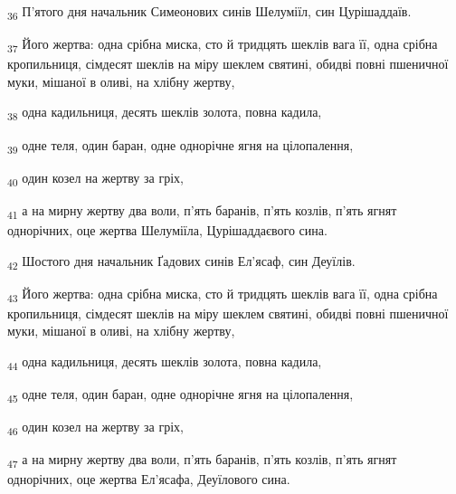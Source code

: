\begin{tcolorbox}
\textsubscript{36} П'ятого дня начальник Симеонових синів Шелуміїл, син Цурішаддаїв.
\end{tcolorbox}
\begin{tcolorbox}
\textsubscript{37} Його жертва: одна срібна миска, сто й тридцять шеклів вага її, одна срібна кропильниця, сімдесят шеклів на міру шеклем святині, обидві повні пшеничної муки, мішаної в оливі, на хлібну жертву,
\end{tcolorbox}
\begin{tcolorbox}
\textsubscript{38} одна кадильниця, десять шеклів золота, повна кадила,
\end{tcolorbox}
\begin{tcolorbox}
\textsubscript{39} одне теля, один баран, одне однорічне ягня на цілопалення,
\end{tcolorbox}
\begin{tcolorbox}
\textsubscript{40} один козел на жертву за гріх,
\end{tcolorbox}
\begin{tcolorbox}
\textsubscript{41} а на мирну жертву два воли, п'ять баранів, п'ять козлів, п'ять ягнят однорічних, оце жертва Шелуміїла, Цурішаддаєвого сина.
\end{tcolorbox}
\begin{tcolorbox}
\textsubscript{42} Шостого дня начальник Ґадових синів Ел'ясаф, син Деуїлів.
\end{tcolorbox}
\begin{tcolorbox}
\textsubscript{43} Його жертва: одна срібна миска, сто й тридцять шеклів вага її, одна срібна кропильниця, сімдесят шеклів на міру шеклем святині, обидві повні пшеничної муки, мішаної в оливі, на хлібну жертву,
\end{tcolorbox}
\begin{tcolorbox}
\textsubscript{44} одна кадильниця, десять шеклів золота, повна кадила,
\end{tcolorbox}
\begin{tcolorbox}
\textsubscript{45} одне теля, один баран, одне однорічне ягня на цілопалення,
\end{tcolorbox}
\begin{tcolorbox}
\textsubscript{46} один козел на жертву за гріх,
\end{tcolorbox}
\begin{tcolorbox}
\textsubscript{47} а на мирну жертву два воли, п'ять баранів, п'ять козлів, п'ять ягнят однорічних, оце жертва Ел'ясафа, Деуїлового сина.
\end{tcolorbox}
